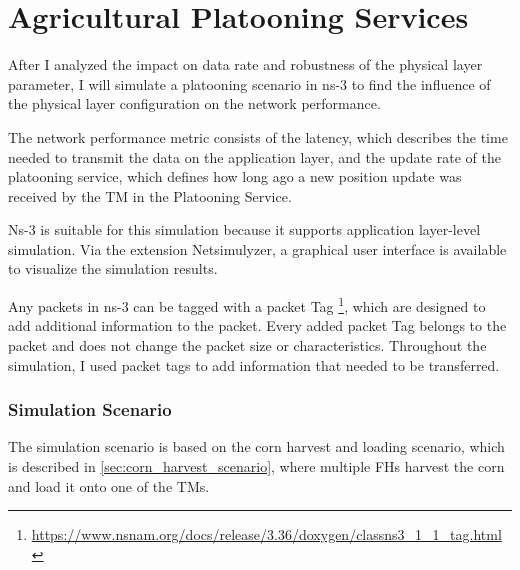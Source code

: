 \section{Agricultural Platooning Services}

After I analyzed the impact on data rate and robustness of the physical layer parameter, I will simulate a platooning scenario in ns-3 to find the influence of the physical layer configuration on the network performance.


The network performance metric consists of the latency, which describes the time needed to transmit the data
on the application layer, and the update rate of the platooning service, which defines how long ago a new position update
was received by the \ac{TM} in the Platooning Service.

Ns-3 is suitable for this simulation because it supports application layer-level simulation.
Via the extension Netsimulyzer, a graphical user interface is available to visualize the simulation results.

Any packets in ns-3 can be tagged with a packet Tag \footnote{\url{https://www.nsnam.org/docs/release/3.36/doxygen/classns3_1_1_tag.html}},
which are designed to add additional information to the packet.
Every added packet Tag belongs to the packet and does not change the packet size or characteristics.
Throughout the simulation, I used packet tags to add information that needed to be transferred.

\subsubsection*{Simulation Scenario}
The simulation scenario is based on the corn harvest and loading scenario, which is described in \autoref{sec:corn_harvest_scenario}, where
multiple \ac{FH}s harvest the corn and load it onto one of the \ac{TM}s.

